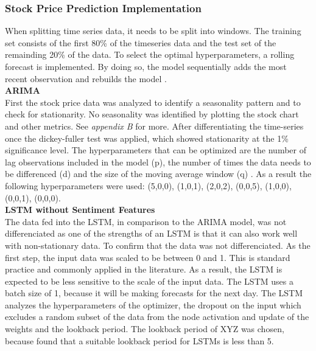 \documentclass[11pt, a4paper]{article}
\begin{document}
\subsubsection{Stock Price Prediction Implementation}
When splitting time series data, it needs to be split into windows. The training set consists of the first 80\% of the timeseries data and
the test set of the remainding 20\% of the data. To select the optimal hyperparameters, a rolling forecast is implemented. By doing so, the model 
sequentially adds the most recent observation and rebuilds the model \citep{sima2018timeseries}.\\

\noindent\textbf{ARIMA}\\
First the stock price data was analyzed to identify a seasonality pattern and to check for stationarity. No seasonality was identified
by plotting the stock chart and other metrics. See \emph{appendix B} for more. %
After differentiating the time-series once the dickey-fuller test was applied, which showed stationarity at the 1\% significance level.
The hyperparameters that can be optimized are the number of lag observations
included in the model (p), the number of times the data needs to be differenced (d) and the size of the moving average window (q) \citep{sima2018timeseries}. As a result the following
hyperparameters were used: (5,0,0), (1,0,1), (2,0,2), (0,0,5), (1,0,0), (0,0,1), (0,0,0). \\

\noindent\textbf{LSTM without Sentiment Features}\\
The data fed into the LSTM, in comparison to the ARIMA model, was not differenciated as one of the strengths of an LSTM is that it can also work well with non-stationary data.
To confirm that the data was not differenciated.
As the first step, the input data was scaled to be between 0 and 1. This is standard practice and commonly applied in the literature. As a result, the LSTM is expected to be
less sensitive to the scale of the input data. The LSTM uses a batch size of 1, because it will be making forecasts for the next day. 
The LSTM analyzes the hyperparameters of the optimizer, the dropout on the input which excludes a random subset of the data from the node activation and update of the weights
and the lookback period. The lookback period of XYZ was chosen, because \cite{saud2020lookback} found that a suitable lookback period for LSTMs is less than 5. \\
\end{document}
